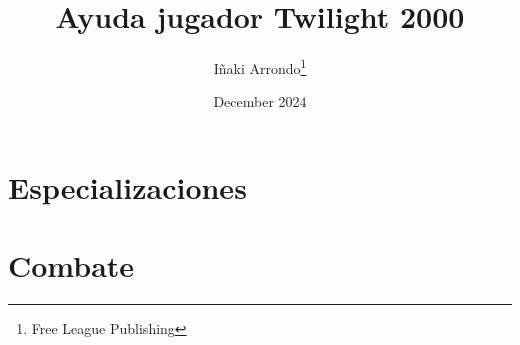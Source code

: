 \documentclass[a4paper,12pt,twoside]{report}
\title{Ayuda jugador Twilight 2000}
\author{Iñaki Arrondo\thanks{Free League Publishing}}
\date{December 2024}
\begin{document}
\maketitle

\chapter{Especializaciones}

\chapter{Combate}



\end{document}
